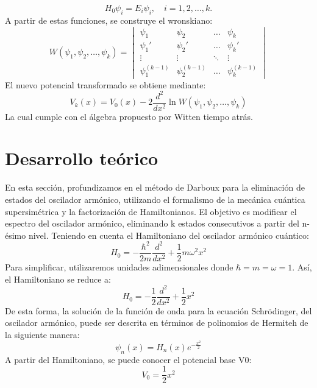 \documentclass[%
 aip,
 jmp,%
 amsmath,amssymb,
 reprint,
]{revtex4-2}
\begin{document}
\begin{equation}
H_0 \psi_i = E_i \psi_i, \quad i = 1, 2, \dots, k.
\end{equation}
A partir de estas funciones, se construye el wronskiano:
\begin{equation}
W(\psi_1, \psi_2, \dots, \psi_k) =
\begin{vmatrix}
\psi_1 & \psi_2 & \dots & \psi_k \\
\psi_1' & \psi_2' & \dots & \psi_k' \\
\vdots & \vdots & \ddots & \vdots \\
\psi_1^{(k-1)} & \psi_2^{(k-1)} & \dots & \psi_k^{(k-1)}
\end{vmatrix}
\end{equation}
El nuevo potencial transformado se obtiene mediante:
\begin{equation}
V_k(x) = V_0(x) - 2 \frac{d^2}{dx^2} \ln W(\psi_1, \psi_2, \dots, \psi_k)
\end{equation}
La cual cumple con el álgebra propuesto por Witten tiempo atrás.

\section{Desarrollo teórico}
En esta sección, profundizamos en el método de Darboux para la eliminación de estados del oscilador armónico, utilizando el formalismo de la mecánica cuántica supersimétrica y la factorización de Hamiltonianos. El objetivo es modificar el espectro del oscilador armónico, eliminando k estados consecutivos a partir del n-ésimo nivel.
Teniendo en cuenta el Hamiltoniano del oscilador armónico cuántico:
\begin{equation}
H_0 = -\frac{\hbar^2}{2m} \frac{d^2}{dx^2} + \frac{1}{2} m \omega^2 x^2
\end{equation}
Para simplificar, utilizaremos unidades adimensionales donde \( \hbar = m = \omega = 1 \). Así, el Hamiltoniano se reduce a:
\begin{equation}
H_0 = -\frac{1}{2} \frac{d^2}{dx^2} + \frac{1}{2} x^2
\end{equation}
De esta forma, la solución de la función de onda para la ecuación Schrödinger, del oscilador armónico, puede ser descrita en términos de polinomios de Hermiteh de la siguiente manera:
\begin{equation}
\psi_n(x) = H_n(x) e^{-\frac{x^2}{2}}
\end{equation}
A partir del Hamiltoniano, se puede conocer el potencial base V0:
\begin{equation}
V_0=\frac{1}{2} x^2
\end{equation}
\end{document}
